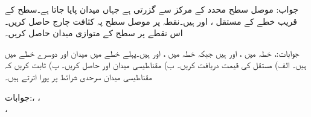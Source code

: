 جواب:
موصل سطح محدد کے مرکز سے گزرتی ہے جہاں میدان  پایا جاتا ہے۔سطح کے قریب خطے کے مستقل ،  اور  ہیں۔نقطہ  پر موصل سطح پہ کثافت چارج حاصل کریں۔اس نقطے پر سطح کے متوازی میدان حاصل کریں۔

جوابات:، 
خطہ  میں ،  اور  ہیں جبکہ خطہ  میں ،  اور  ہیں۔پہلے خطے میں میدان  اور دوسرے خطے میں  ہیں۔ الف) مستقل  کی قیمت دریافت کریں۔ ب) مقناطیسی میدان  اور  حاصل کریں۔ پ) ثابت کریں کہ مقناطیسی میدان سرحدی شرائط پر پورا اترتے ہیں۔

جوابات:، ،\\
  ،
